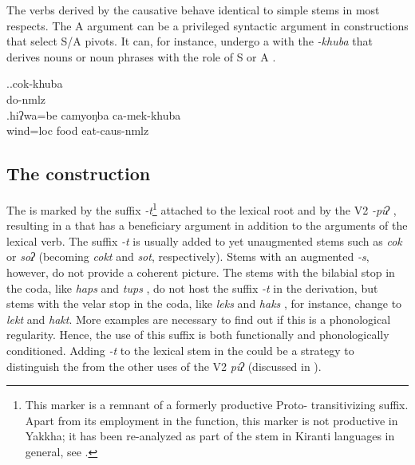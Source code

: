   
 
The verbs derived by the causative behave identical to simple stems in most respects. The A argument can be a privileged syntactic argument in constructions that select S/A pivots. It can, for instance, undergo a  with the  \emph{-khuba} that derives nouns or noun phrases with the role of S or A \Next.  
 
 \ex.\ag.cok-khuba\\
do{\sc -nmlz}\\
\bg.hiʔwa=be    camyoŋba ca-mek-khuba  \\
wind{\sc =loc} food eat{\sc -caus-nmlz}\\




\subsection{The  construction}\label{benefactive}

The  is marked by the suffix \emph{-t}\footnote{This marker is a remnant of a  formerly productive Proto-  transitivizing suffix. Apart from its employment in the  function, this marker is not productive in Yakkha; it has been re-analyzed as part of the stem in Kiranti languages in general, see .} attached to the lexical root and by the V2 \emph{-piʔ} , resulting in a  that has a beneficiary argument in addition to the arguments of the lexical verb. The suffix \emph{-t} is usually added to yet unaugmented stems such as \emph{cok}  or \emph{soʔ}  (becoming \emph{cokt} and \emph{sot}, respectively). Stems with an augmented \emph{-s}, however, do not provide a coherent picture. The stems with the bilabial stop in the coda, like \emph{haps}  and \emph{tups} , do not host the suffix \emph{-t} in the  derivation, but stems with the velar stop in the coda, like \emph{leks}  and \emph{haks} , for instance, change to \emph{lekt} and \emph{hakt}. More examples are necessary to find out if this is a phonological regularity. Hence, the use of this suffix is both functionally and phonologically conditioned. Adding \emph{-t} to the lexical stem in the  could be a strategy to distinguish the  from the other uses of the V2 \emph{piʔ} (discussed in ).

